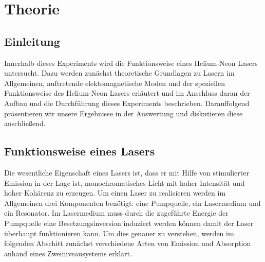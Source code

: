 \section{Theorie}
\label{sec:Theorie}

\subsection{Einleitung}

Innerhalb dieses Experiments wird die Funktionsweise eines Helium-Neon Lasers untersucht.
Dazu werden zunächst theoretische Grundlagen zu Lasern im Allgemeinen, auftretende
elektomagnetische Moden und der speziellen Funktionsweise des Helium-Neon Lasers erläutert
und im Anschluss daran der Aufbau und die Durchführung dieses Experiments beschrieben.
Darauffolgend präsentieren wir unsere Ergebnisse in der Auswertung und diskutieren diese
anschließend.

\subsection{Funktionsweise eines Lasers}

Die wesentliche Eigenschaft eines Lasers ist, dass er mit Hilfe von stimulierter
Emission in der Lage ist, monochromatisches Licht mit hoher Intensität und
hoher Kohärenz zu erzeugen.
Um einen Laser zu realisieren werden im Allgemeinen drei Komponenten benötigt:
eine Pumpquelle, ein Lasermedium und ein Resonator. Im Lasermedium muss durch die zugeführte
Energie der Pumpquelle eine Besetzungsinversion induziert werden können
damit der Laser überhaupt funktionieren kann. Um dies genauer zu verstehen,
werden im folgenden Abschitt zunächst verschiedene Arten von Emission und Absorption
anhand eines Zweiniveausystems erklärt.


